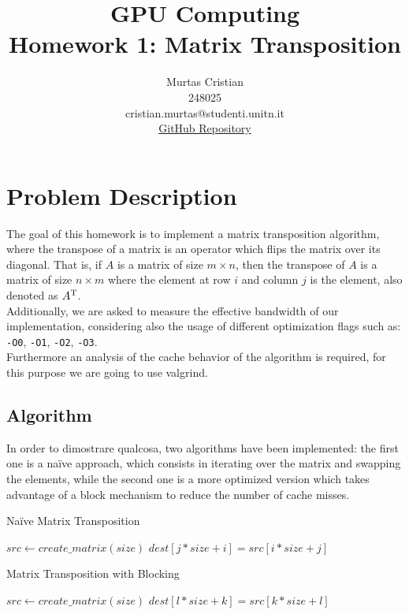 \documentclass{article}
\title{\textbf{GPU Computing} \\
    \large Homework 1: Matrix Transposition \\
}
\author{Murtas Cristian \\ 248025 \\ cristian.murtas@studenti.unitn.it \\
\href{https://github.com/SecondarySkyler/gpu-computing/tree/main/matrix_transposition}{GitHub Repository}
}
\begin{document}
\maketitle

\section{Problem Description}
The goal of this homework is to implement a matrix transposition algorithm, where the transpose of a matrix
is an operator which flips the matrix over its diagonal. That is, if $A$ is a matrix of size $m \times n$, then
the transpose of $A$ is a matrix of size $n \times m$ where the element at row $i$ and column $j$ is the element,
also denoted as $A\textsuperscript{T}$. \\
Additionally, we are asked to measure the effective bandwidth of our implementation, considering also the
usage of different optimization flags such as: \texttt{-O0}, \texttt{-O1}, \texttt{-O2}, \texttt{-O3}. \\
Furthermore an analysis of the cache behavior of the algorithm is required, for this purpose we are going to use
valgrind.
\subsection{Algorithm}
In order to dimostrare qualcosa, two algorithms have been implemented: the first one is a na\"{i}ve approach, which
consists in iterating over the matrix and swapping the elements, while the second one is a more optimized version
which takes advantage of a block mechanism to reduce the number of cache misses.
\begin{algorithm}
    \caption{Na\"{i}ve Matrix Transposition}
    \begin{algorithmic}[1]
        \State $src \gets create\_matrix(size)$
                \State $dest[j * size + i] = src[i * size + j]$
            \EndFor
        \EndFor
    \end{algorithmic}
\end{algorithm}

\begin{algorithm}
    \caption{Matrix Transposition with Blocking}
    \begin{algorithmic}[1]
        \State $src \gets create\_matrix(size)$
                 
                        \State $dest[l * size + k] = src[k * size + l]$
                    \EndFor
                \EndFor
            \EndFor
        \EndFor
    \end{algorithmic}
\end{algorithm}
\end{document}
